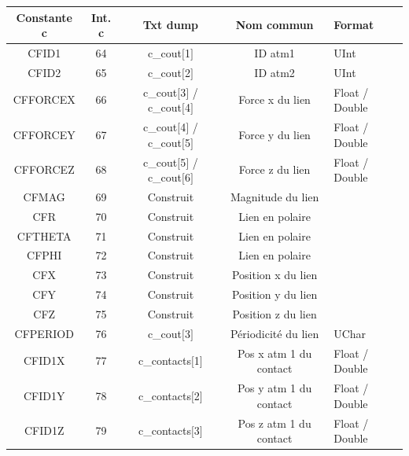 \documentclass[a4paper,12pt]{article}
\begin{document}
{{{\begin{table}
\begin{minipage}{\linewidth}
\renewcommand{\footnoterule}{}
\renewcommand{\thefootnote}{\alph{footnote}}
\begin{tabular}{|c|c|c|c|l|} \hline
  \textbf{Constante c} & \textbf{Int. c} & \textbf{Txt dump} & \textbf{Nom commun} & \textbf{Format} \\ \hline
    \color{green} CFID1 & 64 & c\_cout$[$1$]$ & ID atm1 & UInt\\ \hline
    \color{green}CFID2 & 65 & c\_cout$[$2$]$ &ID atm2 & UInt\\ \hline
    \color{green}CFFORCEX & 66 & c\_cout$[$3$]$ / c\_cout$[$4$]$ \footnotemark[4] & Force x du lien &Float / Double\\ \hline
    \color{green}CFFORCEY & 67 & c\_cout$[$4$]$ / c\_cout$[$5$]$ \footnotemark[4] & Force y du lien & Float / Double\\ \hline
    \color{green}CFFORCEZ & 68 & c\_cout$[$5$]$ / c\_cout$[$6$]$ \footnotemark[4] &Force z du lien & Float / Double\\ \hline
    \color{green}CFMAG & 69 & Construit &Magnitude du lien & \\ \hline
    \color{green}CFR & 70 & Construit & Lien en polaire \footnotemark[1] & \\ \hline
    \color{green}CFTHETA & 71 & Construit & Lien en polaire\footnotemark[1] & \\ \hline
    \color{green}CFPHI & 72 & Construit & Lien en polaire\footnotemark[1] & \\ \hline
    \color{green}CFX & 73 & Construit &Position x du lien\footnotemark[1]& \\ \hline
    \color{green}CFY & 74 & Construit &Position y du lien\footnotemark[1]& \\ \hline
    \color{green}CFZ & 75 & Construit &Position z du lien\footnotemark[1]& \\ \hline
    \color{green}CFPERIOD & 76 & c\_cout$[$3$]$ \footnotemark[4] &P\'eriodicit\'e du lien & UChar\\ \hline   
    \color{green}CFID1X & 77 & c\_contacts$[$1$]$\footnotemark[5] & Pos x atm 1 du contact & Float / Double\\ \hline
    \color{green}CFID1Y & 78 & c\_contacts$[$2$]$\footnotemark[5] & Pos y atm 1 du contact & Float / Double\\ \hline
    \color{green}CFID1Z & 79 & c\_contacts$[$3$]$\footnotemark[5] & Pos z atm 1 du contact & Float / Double\\ \hline

\end{tabular}
\end{minipage}
\end{table}}}}
\end{document}
